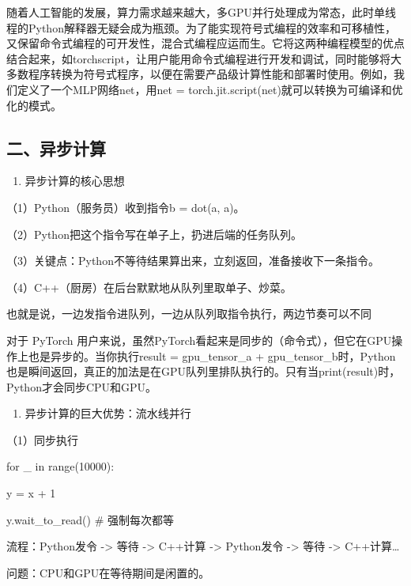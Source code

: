 随着人工智能的发展，算力需求越来越大，多GPU并行处理成为常态，此时单线程的Python解释器无疑会成为瓶颈。为了能实现符号式编程的效率和可移植性，又保留命令式编程的可开发性，混合式编程应运而生。它将这两种编程模型的优点结合起来，如torchscript，让用户能用命令式编程进行开发和调试，同时能够将大多数程序转换为符号式程序，以便在需要产品级计算性能和部署时使用。例如，我们定义了一个MLP网络net，用net = torch.jit.script(net)就可以转换为可编译和优化的模式。

\hypertarget{ux4e8cux5f02ux6b65ux8ba1ux7b97}{%
\subsection{二、异步计算}\label{ux4e8cux5f02ux6b65ux8ba1ux7b97}}

\begin{enumerate}
\def\labelenumi{\arabic{enumi}.}
\tightlist
\item
  异步计算的核心思想
\end{enumerate}

（1）Python（服务员）收到指令b = dot(a, a)。

（2）Python把这个指令写在单子上，扔进后端的任务队列。

（3）关键点：Python不等待结果算出来，立刻返回，准备接收下一条指令。

（4）C++（厨房）在后台默默地从队列里取单子、炒菜。

也就是说，一边发指令进队列，一边从队列取指令执行，两边节奏可以不同

对于 PyTorch 用户来说，虽然PyTorch看起来是同步的（命令式），但它在GPU操作上也是异步的。当你执行result = gpu\_tensor\_a + gpu\_tensor\_b时，Python也是瞬间返回，真正的加法是在GPU队列里排队执行的。只有当print(result)时，Python才会同步CPU和GPU。

\begin{enumerate}
\def\labelenumi{\arabic{enumi}.}
\setcounter{enumi}{1}
\tightlist
\item
  异步计算的巨大优势：流水线并行
\end{enumerate}

（1）同步执行

for \_ in range(10000):

y = x + 1

y.wait\_to\_read() \# 强制每次都等

流程：Python发令 -\textgreater{} 等待 -\textgreater{} C++计算 -\textgreater{} Python发令 -\textgreater{} 等待 -\textgreater{} C++计算\ldots{}

问题：CPU和GPU在等待期间是闲置的。

